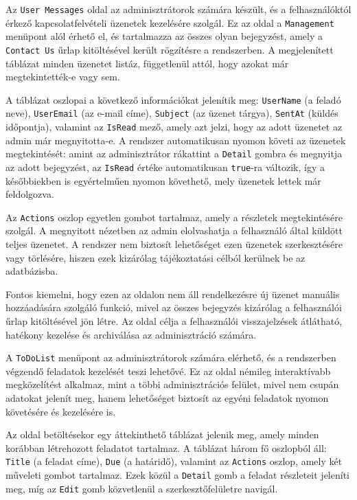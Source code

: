 Az \texttt{User Messages} oldal az adminisztrátorok számára készült, és a felhasználóktól érkező kapcsolatfelvételi üzenetek kezelésére szolgál. Ez az oldal a \texttt{Management} menüpont alól érhető el, és tartalmazza az összes olyan bejegyzést, amely a \texttt{Contact Us} űrlap kitöltésével került rögzítésre a rendszerben. A megjelenített táblázat minden üzenetet listáz, függetlenül attól, hogy azokat már megtekintették-e vagy sem.

A táblázat oszlopai a következő információkat jelenítik meg: \texttt{UserName} (a feladó neve), \texttt{UserEmail} (az e-mail címe), \texttt{Subject} (az üzenet tárgya), \texttt{SentAt} (küldés időpontja), valamint az \texttt{IsRead} mező, amely azt jelzi, hogy az adott üzenetet az admin már megnyitotta-e. A rendszer automatikusan nyomon követi az üzenetek megtekintését: amint az adminisztrátor rákattint a \texttt{Detail} gombra és megnyitja az adott bejegyzést, az \texttt{IsRead} értéke automatikusan \texttt{true}-ra változik, így a későbbiekben is egyértelműen nyomon követhető, mely üzenetek lettek már feldolgozva.

Az \texttt{Actions} oszlop egyetlen gombot tartalmaz, amely a részletek megtekintésére szolgál. A megnyitott nézetben az admin elolvashatja a felhasználó által küldött teljes üzenetet. A rendszer nem biztosít lehetőséget ezen üzenetek szerkesztésére vagy törlésére, hiszen ezek kizárólag tájékoztatási célból kerülnek be az adatbázisba.

Fontos kiemelni, hogy ezen az oldalon nem áll rendelkezésre új üzenet manuális hozzáadására szolgáló funkció, mivel az összes bejegyzés kizárólag a felhasználói űrlap kitöltésével jön létre. Az oldal célja a felhasználói visszajelzések átlátható, hatékony kezelése és archiválása az adminisztráció számára.

A \texttt{ToDoList} menüpont az adminisztrátorok számára elérhető, és a rendszerben végzendő feladatok kezelését teszi lehetővé. Ez az oldal némileg interaktívabb megközelítést alkalmaz, mint a többi adminisztrációs felület, mivel nem csupán adatokat jelenít meg, hanem lehetőséget biztosít az egyéni feladatok nyomon követésére és kezelésére is.

Az oldal betöltésekor egy áttekinthető táblázat jelenik meg, amely minden korábban létrehozott feladatot tartalmaz. A táblázat három fő oszlopból áll: \texttt{Title} (a feladat címe), \texttt{Due} (a határidő), valamint az \texttt{Actions} oszlop, amely két műveleti gombot tartalmaz. Ezek közül a \texttt{Detail} gomb a feladat részleteit jeleníti meg, míg az \texttt{Edit} gomb közvetlenül a szerkesztőfelületre navigál.

